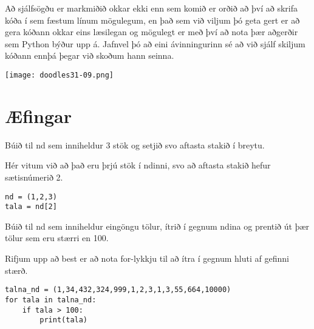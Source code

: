 Að sjálfsögðu er markmiðið okkar ekki enn sem komið er orðið að því að skrifa kóða í sem fæstum línum mögulegum, en það sem við viljum þó geta gert er að gera kóðann okkar eins læsilegan og mögulegt er með því að nota þær aðgerðir sem Python býður upp á.
Jafnvel þó að eini ávinningurinn sé að við sjálf skiljum kóðann ennþá þegar við skoðum hann seinna.

\begin{center}
	\texttt{[image: doodles31-09.png]}
\end{center}

\newpage
\section{Æfingar}
\begin{exercise}\label{nd1}
Búið til nd sem inniheldur 3 stök og setjið svo aftasta stakið í breytu.
\end{exercise}
\begin{Answer}[ref={nd1}]
Hér vitum við að það eru þrjú stök í ndinni, svo að aftasta stakið hefur sætisnúmerið 2.
\begin{lstlisting}
nd = (1,2,3)
tala = nd[2]\end{lstlisting}
\end{Answer}

\begin{exercise}\label{nd2}
Búið til nd sem inniheldur eingöngu tölur, ítrið í gegnum ndina og prentið út þær tölur sem eru stærri en 100.
\end{exercise}
\begin{Answer}[ref={nd2}]
Rifjum upp að best er að nota for-lykkju til að ítra í gegnum hluti af gefinni stærð.
\begin{lstlisting}
talna_nd = (1,34,432,324,999,1,2,3,1,3,55,664,10000)
for tala in talna_nd:
	if tala > 100:
		print(tala)\end{lstlisting}
\end{Answer}

